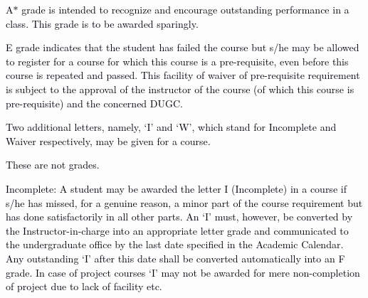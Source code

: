 \documentclass[12pt]{article}
\begin{document}


\vspace{\baselineskip}
{\fontsize{9pt}{10.8pt}\selectfont \textcolor[HTML]{00000A}{A$\ast$  grade is intended to recognize and encourage outstanding performance in a class. This grade is to be awarded sparingly.}\par}\par


\vspace{\baselineskip}
\begin{justify}
{\fontsize{9pt}{10.8pt}\selectfont \textcolor[HTML]{00000A}{E grade indicates that the student has failed the course but s/he may be allowed to register for a course for which this course is a pre-requisite, even before this course is repeated and passed. This facility of waiver of pre-requisite requirement is subject to the approval of the instructor of the course (of which this course is pre-requisite) and the concerned DUGC.}\par}
\end{justify}\par


\vspace{\baselineskip}
{\fontsize{9pt}{10.8pt}\selectfont \textcolor[HTML]{00000A}{Two additional letters, namely, `I' and `W', which stand for Incomplete and Waiver respectively, may be given for a course.}\par}\par


\vspace{\baselineskip}
{\fontsize{10pt}{12.0pt}\selectfont \textcolor[HTML]{00000A}{These are not grades.}\par}\par


\vspace{\baselineskip}
\begin{adjustwidth}{0.5in}{0.0in}
\begin{justify}
{\fontsize{10pt}{12.0pt}\selectfont \textcolor[HTML]{00000A}{Incomplete: A student may be awarded the letter I (Incomplete) in a course if s/he has missed, for a genuine reason, a minor part of the course requirement but has done satisfactorily in all other parts. An `I' must, however, be converted by the Instructor-in-charge into an appropriate letter grade and communicated to the undergraduate office by the last date specified in the Academic Calendar. Any outstanding `I' after this date shall be converted automatically into an F grade. In case of project courses `I' may not be awarded for mere non-completion of project due to lack of facility etc.}\par}
\end{justify}\par

\end{adjustwidth}
\end{document}
